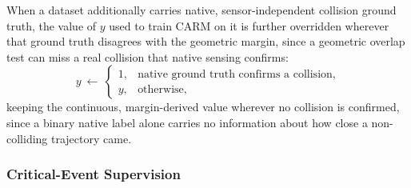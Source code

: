 \documentclass[letterpaper, 10 pt, conference]{ieeeconf}  %
\begin{document}
When a dataset additionally carries native, sensor-independent collision
ground truth, the value of $y$ used to train CARM on it is further
overridden wherever that ground truth disagrees with the geometric
margin, since a geometric overlap test can miss a real collision that
native sensing confirms:
\begin{equation}
y
\ \leftarrow\
\begin{cases}
1, & \text{native ground truth confirms a collision,}\\
y, & \text{otherwise,}
\end{cases}
\label{eq:analytic_risk_target_override}
\end{equation}
keeping the continuous, margin-derived value wherever no collision is
confirmed, since a binary native label alone carries no information about
how close a non-colliding trajectory came.

\subsubsection{Critical-Event Supervision}
\end{document}
